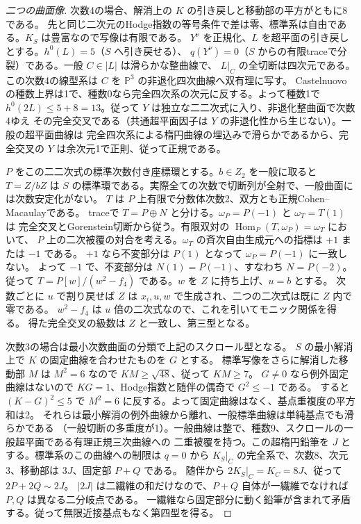 \begin{proof}[二つの曲面像]
次数4の場合、解消上の $K$ の引き戻しと移動部の平方がともに8である。
先と同じ二次元のHodge指数の等号条件で差は零、標準系は自由である。$K_S$ は豊富なので写像は有限である。
$Y^\nu$ を正規化、$L$ を超平面の引き戻しとする。$h^0(L)=5$（$S$ へ引き戻せる）、
$q(Y^\nu)=0$（$S$ からの有限traceで分裂）である。一般 $C\in|L|$ は滑らかな整曲線で、
$L|_C$ の全切断は四次元である。この次数4の線型系は $C$ を $\mathbb P^3$ の非退化四次曲線へ双有理に写す。
Castelnuovoの種数上界は1で、種数0なら完全四次系の次元に反する。よって種数1で
$h^0(2L)\le5+8=13$。従って $Y$ は独立な二二次式に入り、非退化整曲面で次数4ゆえ
その完全交叉である（共通超平面因子は $Y$ の非退化性から生じない）。一般の超平面曲線は
完全四次系による楕円曲線の埋込みで滑らかであるから、完全交叉の $Y$ は余次元1で正則、従って正規である。

$P$ をこの二二次式の標準次数付き座標環とする。$b\in Z_2$ を一般に取ると $T=Z/bZ$
は $S$ の標準環である。実際全ての次数で切断列が全射で、一般曲面には次数安定化がない。
$T$ は $P$ 上有限で分数体次数2、双方とも正規Cohen--Macaulayである。
traceで $T=P\oplus N$ と分ける。$\omega_P=P(-1)$ と $\omega_T=T(1)$ は
完全交叉とGorenstein切断から従う。有限双対の $\operatorname{Hom}_P(T,\omega_P)=\omega_T$ において、
$P$ 上の二次被覆の対合を考える。$\omega_T$ の斉次自由生成元への指標は $+1$ または $-1$ である。
$+1$ なら不変部分は $P(1)$ となって $\omega_P=P(-1)$ に一致しない。
よって $-1$ で、不変部分は $N(1)=P(-1)$、すなわち $N=P(-2)$。
従って $T=P[w]/(w^2-f_4)$ である。$w$ を $Z$ に持ち上げ、$u=b$ とする。
次数ごとに $u$ で割り戻せば $Z$ は $x_i,u,w$ で生成され、二つの二次式は既に $Z$ 内で零である。
$w^2-f_4$ は $u$ 倍の二次式なので、これを引いてモニック関係を得る。
得た完全交叉の級数は $Z$ と一致し、第三型となる。

次数3の場合は最小次数曲面の分類で上記のスクロール型となる。
$S$ の最小解消上で $K$ の固定曲線を合わせたものを $G$ とする。
標準写像をさらに解消した移動部 $M$ は $M^2=6$ なので $KM\ge\sqrt{48}$、従って $KM\ge7$。
$G\ne0$ なら例外固定曲線はないので $KG=1$、Hodge指数と随伴の偶奇で $G^2\le-1$ である。
すると $(K-G)^2\le5$ で $M^2=6$ に反する。よって固定曲線はなく、基点重複度の平方和は2。
それらは最小解消の例外曲線から離れ、一般標準曲線は単純基点でも滑らかである
（一般切断の多重度が1）。一般曲線は整で、種数9、スクロールの一般超平面である有理正規三次曲線への
二重被覆を持つ。この超楕円鉛筆を $J$ とする。標準系のこの曲線への制限は
$q=0$ から $K_S|_C$ の完全系で、次数8、次元3、移動部は $3J$、固定部 $P+Q$ である。
随伴から $2K_S|_C=K_C=8J$、従って $2P+2Q\sim2J$。
$|2J|$ は二繊維の和だけなので、$P+Q$ 自体が一繊維でなければ $P,Q$ は異なる二分岐点である。
一繊維なら固定部分に動く鉛筆が含まれて矛盾する。従って無限近接基点もなく第四型を得る。
\end{proof}
